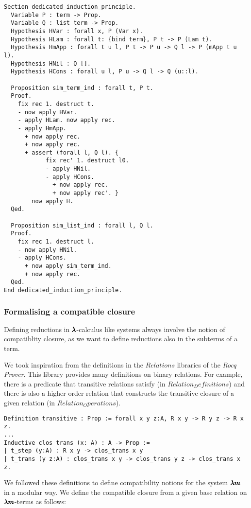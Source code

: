 \begin{lstlisting}[language=Coq]
Section dedicated_induction_principle.
  Variable P : term -> Prop.
  Variable Q : list term -> Prop.
  Hypothesis HVar : forall x, P (Var x).
  Hypothesis HLam : forall t: {bind term}, P t -> P (Lam t).
  Hypothesis HmApp : forall t u l, P t -> P u -> Q l -> P (mApp t u l).
  Hypothesis HNil : Q [].
  Hypothesis HCons : forall u l, P u -> Q l -> Q (u::l).
  
  Proposition sim_term_ind : forall t, P t.
  Proof.
    fix rec 1. destruct t.
    - now apply HVar.
    - apply HLam. now apply rec.
    - apply HmApp.
      + now apply rec.
      + now apply rec.
      + assert (forall l, Q l). {
            fix rec' 1. destruct l0.
            - apply HNil.
            - apply HCons.
              + now apply rec.
              + now apply rec'. }          
        now apply H.
  Qed.      
  
  Proposition sim_list_ind : forall l, Q l.
  Proof.
    fix rec 1. destruct l.
    - now apply HNil.
    - apply HCons.
      + now apply sim_term_ind.
      + now apply rec.
  Qed.          
End dedicated_induction_principle.
\end{lstlisting}

\subsubsection{Formalising a compatible closure}

Defining reductions in $\pmb{\lambda}$-calculus like systems always involve the notion of compatiblity closure, as we want to define reductions also in the subterms of a term.

We took inspiration from the definitions in the \lst$Relations$ libraries of the \textit{Rocq Prover}.
This library provides many definitions on binary relations.
For example, there is a predicate that transitive relations satisfy (in \lst$Relation_Definitions$) and there is also a higher order relation that constructs the transitive closure of a given relation (in \lst$Relation_Operations$).

\begin{lstlisting}[language=Coq]
Definition transitive : Prop := forall x y z:A, R x y -> R y z -> R x z.
...
Inductive clos_trans (x: A) : A -> Prop :=
| t_step (y:A) : R x y -> clos_trans x y
| t_trans (y z:A) : clos_trans x y -> clos_trans y z -> clos_trans x z.
\end{lstlisting}

We followed these definitions to define compatibility notions for the system $\pmb{\lambda m}$ in a modular way.
We define the compatible closure from a given base relation on $\pmb{\lambda m}$-terms as follows:

